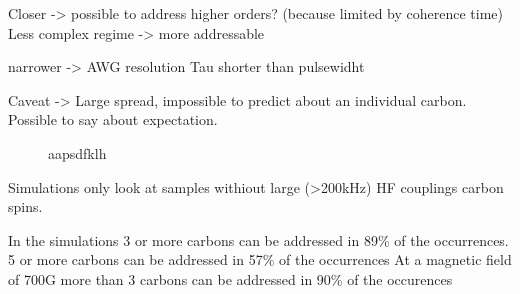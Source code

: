 Closer -> possible to address higher orders? (because limited by coherence time)
Less complex regime -> more addressable

narrower -> AWG resolution
Tau shorter than pulsewidht

Caveat -> Large spread, impossible to predict about an individual carbon. Possible to say about expectation.

\begin{figure}[htbp]

    \begin{subfigure}[t]{0.49\textwidth}\centering
        \caption{}
        \label{fig:Simulations_avg_n_vs_bfield}
    \end{subfigure}
    \begin{subfigure}[t]{0.49\textwidth}\centering
    \caption{}
    \label{fig:simulations_histogram_vs_Bfield}
    \end{subfigure}
    \caption{aapsdfklh }
    \label{fig:FP}
\end{figure}

Simulations only look at samples withiout large (>200kHz) HF couplings  carbon spins.

In the simulations 3 or more carbons can be addressed in 89\% of the occurrences.
5 or more carbons can be addressed in 57\% of the occurrences
At a magnetic field of 700G more than 3 carbons can be addressed in 90\% of the occurences



